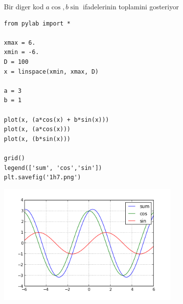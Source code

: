\documentclass[12pt,fleqn]{article}\usepackage{../common}
\begin{document}
Bir diger kod $a \cos,b \sin$ ifadelerinin toplamini gosteriyor

\begin{verbatim}
from pylab import *

xmax = 6.
xmin = -6.
D = 100
x = linspace(xmin, xmax, D)

a = 3
b = 1

plot(x, (a*cos(x) + b*sin(x)))
plot(x, (a*cos(x)))
plot(x, (b*sin(x)))

grid()
legend(['sum', 'cos','sin'])
plt.savefig('1h7.png')
\end{verbatim}

\includegraphics[height=6cm]{1h7.png}
\end{document}
